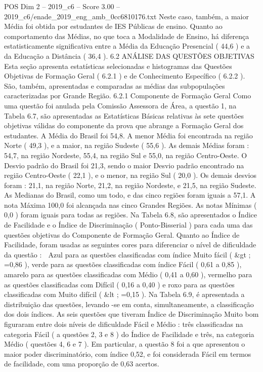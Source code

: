 \begin{textsample}{POS Dim 2 – 2019\_c6 – Score 3.00 – 2019\_c6/enade\_2019\_eng\_amb\_0cc6810176.txt}
Neste caso, também, a maior Média foi obtida por estudantes de IES Públicas de ensino.
Quanto ao comportamento das Médias, no que toca a Modalidade de Ensino, há diferença estatisticamente significativa entre a Média da Educação Presencial ( 44,6 ) e a da Educação a Distância ( 36,4 ). 6.2 ANÁLISE DAS QUESTÕES OBJETIVAS Esta seção apresenta estatísticas selecionadas e histogramas das Questões Objetivas de Formação Geral ( 6.2.1 ) e de Conhecimento Específico ( 6.2.2 ).
São, também, apresentadas e comparadas as médias das subpopulações caracterizadas por Grande Região. 6.2.1 Componente de Formação Geral Como uma questão foi anulada pela Comissão Assessora de Área, a questão 1, na Tabela 6.7, são apresentadas as Estatísticas Básicas relativas às sete questões objetivas válidas do componente da prova que abrange a Formação Geral dos estudantes.
A Média do Brasil foi 54,8.
A menor Média foi encontrada na região Norte ( 49,3 ), e a maior, na região Sudeste ( 55,6 ).
As demais Médias foram : 54,7, na região Nordeste, 55,4, na região Sul e 55,0, na região Centro-Oeste.
O Desvio padrão do Brasil foi 21,3, sendo o maior Desvio padrão encontrado na região Centro-Oeste ( 22,1 ), e o menor, na região Sul ( 20,0 ).
Os demais desvios foram : 21,1, na região Norte, 21,2, na região Nordeste, e 21,5, na região Sudeste.
As Medianas do Brasil, como um todo, e das cinco regiões foram iguais a 57,1.
A nota Máxima 100,0 foi alcançada nas cinco Grandes Regiões.
As notas Mínimas ( 0,0 ) foram iguais para todas as regiões.
Na Tabela 6.8, são apresentados o Índice de Facilidade e o Índice de Discriminação ( Ponto-Bisserial ) para cada uma das questões objetivas do Componente de Formação Geral.
Quanto ao Índice de Facilidade, foram usadas as seguintes cores para diferenciar o nível de dificuldade da questão :  Azul para as questões classificadas com índice Muito fácil ( \&gt ; =0,86 ), verde para as questões classificadas com índice Fácil ( 0,61 a 0,85 ), amarelo para as questões classificadas com Médio ( 0,41 a 0,60 ), vermelho para as questões classificadas com Difícil ( 0,16 a 0,40 ) e roxo para as questões classificadas com Muito difícil ( \&lt ; =0,15 ).
Na Tabela 6.9, é apresentada a distribuição das questões, levando -se em conta, simultaneamente, a classificação dos dois índices.
As seis questões que tiveram Índice de Discriminação Muito bom figuraram entre dois níveis de dificuldade Fácil e Médio : três classificadas na categoria Fácil ( a questões 2, 3 e 8 ) do Índice de Facilidade e três, na categoria Médio ( questões 4, 6 e 7 ).
Em particular, a questão 8 foi a que apresentou o maior poder discriminatório, com índice 0,52, e foi considerada Fácil em termos de facilidade, com uma proporção de 0,63 acertos.

\end{textsample}
